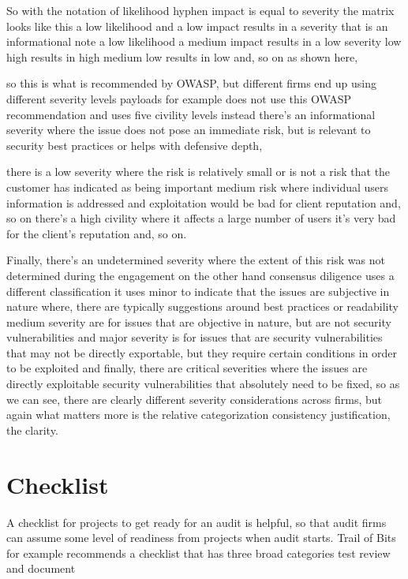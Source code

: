 So with the notation of likelihood hyphen impact is equal to severity the matrix looks like this a low likelihood and a low impact results in a severity that is an informational note a low likelihood a medium impact results in a low severity low high results in high medium low results in low and, so on as shown here, 

so this is what is recommended by OWASP, but different firms end up using different severity levels payloads for example does not use this OWASP recommendation and uses five civility levels instead there's an informational severity where the issue does not pose an immediate risk, but is relevant to security best practices or helps with defensive depth, 

there is a low severity where the risk is relatively small or is not a risk that the customer has indicated as being important medium risk where individual users information is addressed and exploitation would be bad for client reputation and, so on there's a high civility where it affects a large number of users it's very bad for the client's reputation and, so on. 

Finally, there's an undetermined severity where the extent of this risk was not determined during the engagement on the other hand consensus diligence uses a different classification it uses minor to indicate that the issues are subjective in nature where, there are typically suggestions around best practices or readability medium severity are for issues that are objective in nature, but are not security vulnerabilities and major severity is for issues that are security vulnerabilities that may not be directly exportable, but they require certain conditions in order to be exploited and finally, there are critical severities where the issues are directly exploitable security vulnerabilities that absolutely need to be fixed, so as we can see, there are clearly different severity considerations across firms, but again what matters more is the relative categorization consistency justification, the clarity.

\section{Checklist}

A checklist for projects to get ready for an audit is helpful, so that audit firms can assume some level of readiness from projects when audit starts. Trail of Bits for example recommends a checklist that has three broad categories test review and document 

